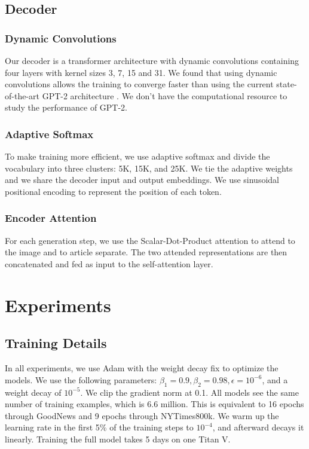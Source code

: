 \documentclass[10pt,twocolumn,letterpaper]{article}
\begin{document}
\subsection{Decoder}

\subsubsection{Dynamic Convolutions}

Our decoder is a transformer architecture with dynamic convolutions
\cite{Wu2018PayLA} containing four layers with kernel sizes 3, 7, 15 and 31. We
found that using dynamic convolutions allows the training to converge faster
than using the current state-of-the-art GPT-2 architecture
\cite{Radford2019LanguageMA}. We don't have the computational resource to study
the performance of GPT-2.

\subsubsection{Adaptive Softmax}

To make training more efficient, we use adaptive softmax
\cite{Grave2016EfficientSA} and divide the vocabulary into three clusters: 5K,
15K, and 25K. We tie the adaptive weights and we share the decoder input and
output embeddings. We use sinusoidal positional encoding
\cite{Vaswani2017AttentionIA} to represent the position of each token.

\subsubsection{Encoder Attention}

For each generation step, we use the Scalar-Dot-Product attention
\cite{Vaswani2017AttentionIA} to attend to the image and to article separate.
The two attended representations are then concatenated and fed as input to
the self-attention layer.


\section{Experiments}

\subsection{Training Details}

In all experiments, we use Adam \cite{Kingma2015Adam} with the weight decay fix
\cite{Loshchilov2018DecoupledWD} to optimize the models. We use the following
parameters: $\beta_1 = 0.9, \beta_2 = 0.98, \epsilon = 10^{-6}$, and a weight
decay of $10^{-5}$. We clip the gradient norm at 0.1. All models see the same
number of training examples, which is 6.6 million. This is equivalent to 16
epochs through GoodNews and 9 epochs through NYTimes800k. We warm up the
learning rate in the first 5\% of the training steps to $10^{-4}$, and
afterward decays it linearly. Training the full model takes 5 days on one Titan
V.
\end{document}
